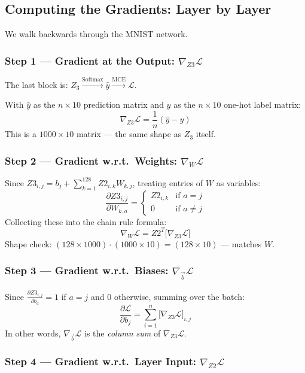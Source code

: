 \documentclass[12pt]{article}
\begin{document}
\subsection{Computing the Gradients: Layer by Layer}

We walk backwards through the MNIST network.

\subsubsection{Step 1 --- Gradient at the Output: $\nabla_{Z3}\mathcal{L}$}

The last block is: $Z_3 \xrightarrow{\text{Softmax}} \hat{y} \xrightarrow{\text{MCE}} \mathcal{L}$.

With $\hat{y}$ as the $n \times 10$ prediction matrix and $y$ as the $n \times 10$ one-hot label matrix:
\[
\boxed{\nabla_{Z3}\mathcal{L} = \frac{1}{n}(\hat{y} - y)}
\]
This is a $1000 \times 10$ matrix --- the same shape as $Z_3$ itself.

\subsubsection{Step 2 --- Gradient w.r.t.\ Weights: $\nabla_W \mathcal{L}$}

Since $Z3_{i,j} = b_j + \sum_{k=1}^{128} Z2_{i,k} W_{k,j}$, treating entries of $W$ as variables:
\[
\frac{\partial Z3_{i,j}}{\partial W_{k,a}} = \begin{cases} Z2_{i,k} & \text{if } a = j \\ 0 & \text{if } a \neq j \end{cases}
\]
Collecting these into the chain rule formula:
\[
\boxed{\nabla_W \mathcal{L} = Z2^T \big[\nabla_{Z3}\mathcal{L}\big]}
\]
Shape check: $(128 \times 1000) \cdot (1000 \times 10) = (128 \times 10)$ --- matches $W$.

\subsubsection{Step 3 --- Gradient w.r.t.\ Biases: $\nabla_{\vec{b}}\mathcal{L}$}

Since $\frac{\partial Z3_{i,j}}{\partial b_a} = 1$ if $a = j$ and $0$ otherwise, summing over the batch:
\[
\boxed{\frac{\partial \mathcal{L}}{\partial b_j} = \sum_{i=1}^{n} \big[\nabla_{Z3}\mathcal{L}\big]_{i,j}}
\]
In other words, $\nabla_{\vec{b}}\mathcal{L}$ is the \emph{column sum} of $\nabla_{Z3}\mathcal{L}$.

\subsubsection{Step 4 --- Gradient w.r.t.\ Layer Input: $\nabla_{Z2}\mathcal{L}$}
\end{document}
